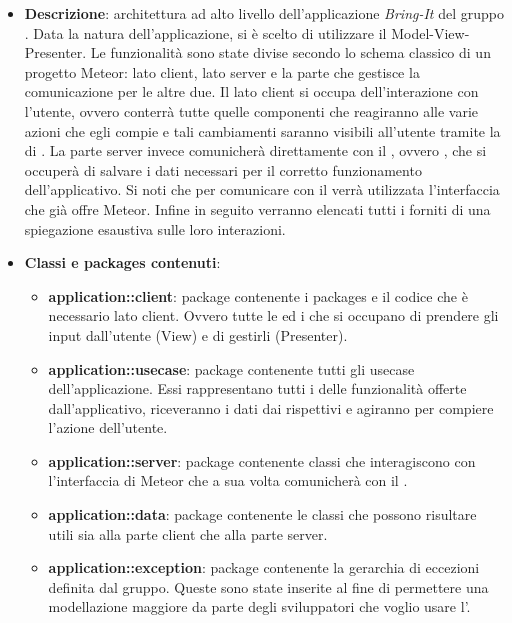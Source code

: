 \begin{itemize}

	\item \textbf{Descrizione}: architettura ad alto livello dell’applicazione \textit{Bring-It} del gruppo \gruppo. Data la natura dell'applicazione, si è scelto di utilizzare il  Model-View-Presenter. Le funzionalità sono state divise secondo lo schema classico di un progetto Meteor: lato client, lato server e la parte che gestisce la comunicazione per le altre due. Il lato client si occupa dell'interazione con l'utente, ovvero conterrà tutte quelle componenti che reagiranno alle varie azioni che egli compie e tali cambiamenti saranno visibili all'utente tramite la  di . La parte server invece comunicherà direttamente con il , ovvero , che si occuperà di salvare i dati necessari per il corretto funzionamento dell'applicativo. Si noti che per comunicare con il  verrà utilizzata l'interfaccia che già offre Meteor.
Infine in seguito verranno elencati tutti i  forniti di una spiegazione esaustiva sulle loro interazioni.
	\item \textbf{Classi e packages contenuti}:
	\begin{itemize}
		\item \textbf{application::client}: package contenente i packages e il codice che è necessario lato client. Ovvero tutte le  ed i  che si occupano di prendere gli input dall'utente (View) e di gestirli (Presenter).
		\item \textbf{application::usecase}: package contenente tutti gli usecase dell'applicazione. Essi rappresentano tutti i  delle funzionalità offerte dall'applicativo, riceveranno i dati dai rispettivi  e agiranno per compiere l'azione dell'utente.
		\item \textbf{application::server}: package contenente classi che interagiscono con l'interfaccia di Meteor che a sua volta comunicherà con il  .
		\item \textbf{application::data}: package contenente le classi che possono risultare utili sia alla parte client che alla parte server.
		\item \textbf{application::exception}: package contenente la gerarchia di eccezioni definita dal gruppo. Queste sono state inserite al fine di permettere una modellazione maggiore da parte degli sviluppatori che voglio usare l'.

\end{itemize}
\end{itemize}
